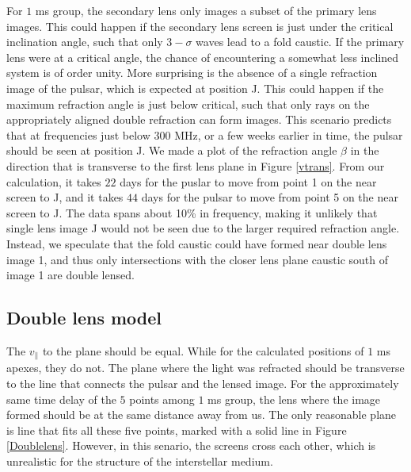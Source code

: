 \documentclass[useAMS,usenatbib]{mn2e}
\begin{document}
For $1$ ms group, the secondary lens
only images a subset of the primary lens images.  This could happen if
the secondary lens screen is just under the critical inclination
angle, such that only $3-\sigma$ waves lead to a fold caustic.  If the
primary lens were at a critical angle, the chance of encountering a
somewhat less inclined system is of order unity.
More surprising is the absence of a single refraction
image of the pulsar, which is expected at position J.  This could
happen if the maximum refraction angle is just below critical, such
that only rays on the appropriately aligned double refraction can form
images.  This scenario predicts that at frequencies just below $300$
MHz, or a few weeks earlier in time, the pulsar should be seen at
position J. We made a plot of the refraction angle $\beta$ in the
direction that is transverse to the first lens plane in Figure
\ref{vtrans}.  From our calculation, it takes $22$ days for the puslar
to move from point 1 on the near screen to J, and it takes $44$ days
for the pulsar to move from point 5 on the near screen to J.  The data
spans about 10\% in frequency, making it unlikely that single lens
image J would not be seen due to the larger required refraction
angle.  Instead, we speculate that the fold caustic could have formed
near double lens image 1, and thus only intersections with the closer
lens plane caustic south of image 1 are double lensed.

\subsection{Double lens model}
The $v_{\parallel}$ to the plane should be equal. While for the calculated positions of $1$ ms apexes, they do not. The plane where the light was refracted should be transverse to the line that connects the pulsar and the lensed image. For the approximately same time delay of the $5$ points among $1$ ms group, the lens where the image formed should be at the same distance away from us. The only reasonable plane is line that fits all these five points, marked with a solid line in Figure \ref{Doublelens}.  However, in this senario, the screens cross each other, which is unrealistic for the structure of the interstellar medium. 
\end{document}
